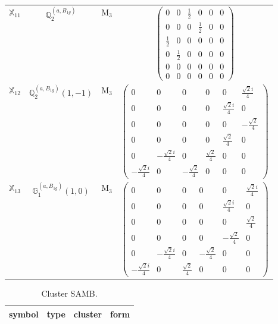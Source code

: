 \documentclass[fleqn,10pt,landscape]{article}
\begin{document}
\begin{itemize}
\begin{center}
\begin{longtable}{c|c|c|c}
$ \mathbb{X}_{11} $ & $\mathbb{Q}_{2}^{(a,B_{1g})}$ & M$_{3}$ & $\begin{pmatrix} 0 & 0 & \frac{1}{2} & 0 & 0 & 0 \\ 0 & 0 & 0 & \frac{1}{2} & 0 & 0 \\ \frac{1}{2} & 0 & 0 & 0 & 0 & 0 \\ 0 & \frac{1}{2} & 0 & 0 & 0 & 0 \\ 0 & 0 & 0 & 0 & 0 & 0 \\ 0 & 0 & 0 & 0 & 0 & 0 \end{pmatrix}$ \\
$ \mathbb{X}_{12} $ & $\mathbb{Q}_{2}^{(a,B_{1g})}(1,-1)$ & M$_{3}$ & $\begin{pmatrix} 0 & 0 & 0 & 0 & 0 & \frac{\sqrt{2} i}{4} \\ 0 & 0 & 0 & 0 & \frac{\sqrt{2} i}{4} & 0 \\ 0 & 0 & 0 & 0 & 0 & - \frac{\sqrt{2}}{4} \\ 0 & 0 & 0 & 0 & \frac{\sqrt{2}}{4} & 0 \\ 0 & - \frac{\sqrt{2} i}{4} & 0 & \frac{\sqrt{2}}{4} & 0 & 0 \\ - \frac{\sqrt{2} i}{4} & 0 & - \frac{\sqrt{2}}{4} & 0 & 0 & 0 \end{pmatrix}$ \\
$ \mathbb{X}_{13} $ & $\mathbb{G}_{1}^{(a,B_{1g})}(1,0)$ & M$_{3}$ & $\begin{pmatrix} 0 & 0 & 0 & 0 & 0 & \frac{\sqrt{2} i}{4} \\ 0 & 0 & 0 & 0 & \frac{\sqrt{2} i}{4} & 0 \\ 0 & 0 & 0 & 0 & 0 & \frac{\sqrt{2}}{4} \\ 0 & 0 & 0 & 0 & - \frac{\sqrt{2}}{4} & 0 \\ 0 & - \frac{\sqrt{2} i}{4} & 0 & - \frac{\sqrt{2}}{4} & 0 & 0 \\ - \frac{\sqrt{2} i}{4} & 0 & \frac{\sqrt{2}}{4} & 0 & 0 & 0 \end{pmatrix}$ \\
\end{longtable}
\end{center}
\begin{center}
\renewcommand{\arraystretch}{1.3}
\begin{longtable}{c|c|c|c}
\caption{Cluster SAMB.}
 \\
 \hline \hline
symbol & type & cluster & form \\ \hline \endfirsthead


\end{longtable}
\end{center}
\end{itemize}
\end{document}
